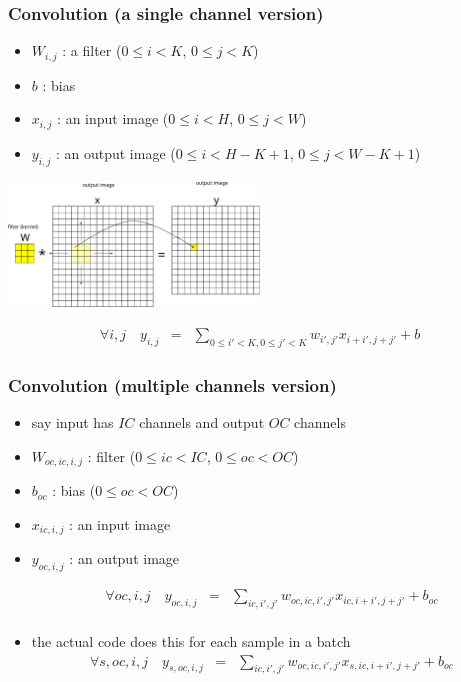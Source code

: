 \documentclass[12pt,dvipdfmx]{beamer}
\begin{document}
\begin{frame}
  \frametitle{Convolution (a single channel version)}
\begin{itemize}
\item $W_{i,j}$ : a filter ($0 \leq i < K$, $0 \leq j < K$)
\item $b$ : bias
\item $x_{i,j}$ : an input image ($0 \leq i < H$, $0 \leq j < W$)
\item $y_{i,j}$ : an output image ($0 \leq i < H - K + 1$, $0 \leq j < W - K + 1$)
\end{itemize}
\begin{center}
  \includegraphics[width=0.5\textwidth]{out/pdf/svg/conv_1.pdf}
\end{center}

  \begin{eqnarray*}
\forall i, j \quad y_{i,j} & = & \sum_{0 \leq i' < K, 0 \leq j' < K} w_{i',j'} x_{i+i',j+j'} + b
  \end{eqnarray*}
\end{frame}


\begin{frame}
  \frametitle{Convolution (multiple channels version)}
  \begin{itemize}
  \item say input has $IC$ channels and output $OC$ channels
  \item $W_{oc,ic,i,j}$ : filter ($0 \leq ic < IC$, $0 \leq oc < OC$)
  \item $b_{oc}$ : bias ($0 \leq oc < OC$)
  \item $x_{ic,i,j}$ : an input image
  \item $y_{oc,i,j}$ : an output image

    \begin{eqnarray*}
      \forall oc, i, j \quad
    y_{oc,i,j} & = & \sum_{ic,i',j'} w_{oc,ic,i',j'} x_{ic,i+i',j+j'} + b_{oc}\\
    \end{eqnarray*}

  \item the actual code does this for each sample in a batch
  \begin{eqnarray*}
    \forall s, oc, i, j \quad
    y_{s,oc,i,j} & = & \sum_{ic,i',j'} w_{oc,ic,i',j'} x_{s,ic,i+i',j+j'} + b_{oc}\\
  \end{eqnarray*}
\end{itemize}
\end{frame}
\end{document}
